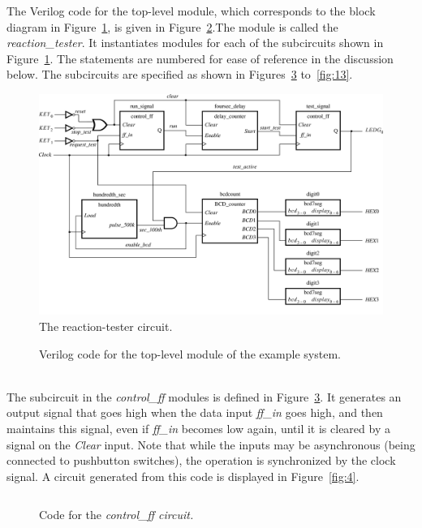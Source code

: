 \documentclass[11pt, twoside, pdftex]{article}
\begin{document}
The Verilog code for the top-level module, which corresponds to the block diagram 
in Figure~\ref{fig:1}, is given in Figure~\ref{fig:2}.The module is called the {\it reaction\_tester}.
It instantiates modules for each of the subcircuits shown in Figure~\ref{fig:1}.
The statements are numbered for ease of reference in the discussion below.
The subcircuits are specified as shown in Figures~\ref{fig:3} to~\ref{fig:13}.

\begin{figure}[H]
   \begin{center}
      \includegraphics[scale=0.9]{figures/figure1.png}
   \caption{The reaction-tester circuit.} 
	 \label{fig:1}
	 \end{center}
\end{figure}

\begin{figure}[H]
	
	\caption{Verilog code for the top-level module of the example system.}
	\label{fig:2}
\end{figure}
~\\
The subcircuit in the {\it control\_ff} modules is defined in Figure~\ref{fig:3}.
It generates an output signal that goes high when the data input
{\it ff\_in} goes high, and then maintains this signal, even if {\it ff\_in}
becomes low again, until it is cleared by a
signal on the {\it Clear} input. Note that while the inputs may be asynchronous 
(being connected to pushbutton switches), the operation is synchronized by the 
clock signal. A circuit generated from this code is displayed in Figure~\ref{fig:4}.

\begin{figure}[H]
\begin{center} %
\begin{tabular}{c}

\end{tabular}
\end{center}
	\caption{Code for the \it{control\_ff} circuit.}
	\label{fig:3}
\end{figure}
\end{document}
